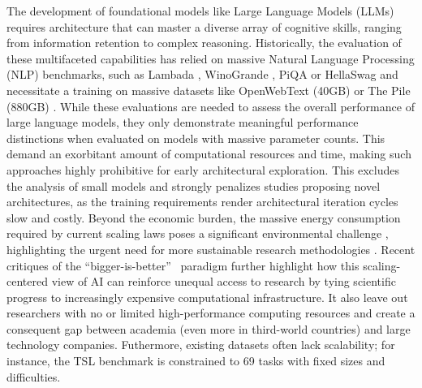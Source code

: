 \documentclass{article}
\begin{document}
The development of foundational models like Large Language Models (LLMs) requires architecture that can master a diverse array of cognitive skills, ranging from information retention to complex reasoning. Historically, the evaluation of these multifaceted capabilities has relied on massive Natural Language Processing (NLP) benchmarks, such as Lambada \cite{paperno2016lambada}, WinoGrande \cite{sakaguchi2021winogrande}, PiQA \cite{bisk2020piqa} or HellaSwag \cite{zellers2019hellaswag} and necessitate a training on massive datasets like OpenWebText (40GB) \cite{Gokaslan2019OpenWeb} or The Pile (880GB) \cite{gao2020pile}. While these evaluations are needed to assess the overall performance of large language models, they only demonstrate meaningful performance distinctions when evaluated on models with massive parameter counts. 
This demand an exorbitant amount of computational resources and time, making  such approaches highly prohibitive for early architectural exploration.
This excludes the analysis of small models and strongly penalizes studies 
proposing novel architectures, as the training requirements render architectural iteration cycles slow and costly.
Beyond the economic burden, the massive energy consumption required by current scaling laws poses a significant environmental challenge \cite{strubell2019energy, patterson2021carbon}, highlighting the urgent need for more sustainable research methodologies \cite{schwartz2020green}.
Recent critiques of the ``bigger-is-better''~\cite{varoquaux2025hype} paradigm further highlight how this scaling-centered view of AI can reinforce unequal access to research by tying scientific progress to increasingly expensive computational infrastructure.
It also leave out researchers with no or limited high-performance computing resources and create a consequent gap between academia (even more in third-world countries) and large technology companies.
Futhermore, existing datasets often lack scalability; for instance, the TSL benchmark is constrained to 69 tasks with fixed sizes and difficulties. 
\end{document}
